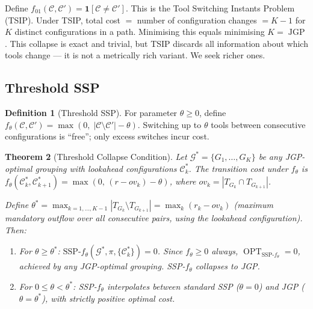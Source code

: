 \documentclass[11pt,a4paper]{article}
\theoremstyle{plain}
\newtheorem{theorem}{Theorem}[section]
\theoremstyle{definition}
\newtheorem{definition}[theorem]{Definition}
\DeclareMathOperator{\OPT}{OPT}
\DeclareMathOperator{\JGP}{JGP}
\newcommand{\calG}{\mathcal{G}}     %
\begin{document}
Define $f_{\mathrm{01}}(\mathcal{C}, \mathcal{C}') = \mathbf{1}[\mathcal{C} \ne \mathcal{C}']$.
This is the Tool Switching Instants Problem (TSIP).
Under TSIP, total cost $=$ number of configuration changes $= K - 1$ for $K$ distinct
configurations in a path. Minimising this equals minimising $K = \JGP$. This collapse is
exact and trivial, but TSIP discards all information about which tools change --- it is
not a metrically rich variant. We seek richer ones.

\subsection{Threshold SSP}
\label{sec:threshold}

\begin{definition}[Threshold SSP]
\label{def:thresholdSSP}
For parameter $\theta \ge 0$, define
$f_\theta(\mathcal{C}, \mathcal{C}') = \max(0,\; |\mathcal{C} \setminus \mathcal{C}'| - \theta)$.
Switching up to $\theta$ tools between consecutive configurations is ``free'';
only excess switches incur cost.
\end{definition}

\begin{thmbox}
\begin{theorem}[Threshold Collapse Condition]
\label{thm:threshold}
Let $\calG^* = \{G_1,\ldots,G_K\}$ be any JGP-optimal grouping
with lookahead configurations $\mathcal{C}_k^*$.
The transition cost under $f_\theta$ is
$f_\theta(\mathcal{C}_k^*, \mathcal{C}_{k+1}^*) = \max(0,\, (r - \mathit{ov}_k) - \theta)$,
where $\mathit{ov}_k = |T_{G_k} \cap T_{G_{k+1}}|$.

Define $\theta^* = \max_{k=1,\ldots,K-1} |T_{G_k} \setminus T_{G_{k+1}}|
= \max_k (r_k - \mathit{ov}_k)$
(maximum mandatory outflow over all consecutive pairs, using the lookahead configuration).
Then:
\begin{enumerate}[label=(\roman*)]
  \item For $\theta \ge \theta^*$: $\mathrm{SSP}\text{-}f_\theta(\calG^*, \pi, \{\mathcal{C}_k^*\}) = 0$.
        Since $f_\theta \ge 0$ always, $\OPT_{\mathrm{SSP}\text{-}f_\theta} = 0$, achieved
        by any JGP-optimal grouping. SSP-$f_{\theta}$ \emph{collapses to JGP}.
  \item For $0 \le \theta < \theta^*$: SSP-$f_\theta$ interpolates between standard SSP
        ($\theta = 0$) and JGP ($\theta = \theta^*$), with strictly positive optimal cost.
\end{enumerate}
\end{theorem}
\end{thmbox}
\end{document}
